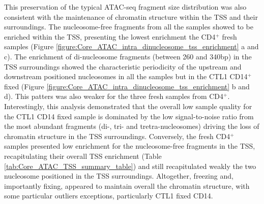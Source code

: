 This preservation of the typical ATAC-seq fragment size distribution was also consistent with the maintenance of chromatin structure within the TSS and their surroundings. The nucleosome-free fragments from all the samples showed to be enriched within the TSS, presenting the lowest enrichment the CD4$^+$ fresh samples (Figure \ref{figure:Core_ATAC_intra_dinucleosome_tss_enrichment} a and c). The enrichment of di-nucleosome fragments (between 260 and 340bp) in the TSS surroundings showed the characteristic periodicity of the upstream and downstream positioned nucleosomes in all the samples but in the CTL1 CD14$^+$ fixed (Figure \ref{figure:Core_ATAC_intra_dinucleosome_tss_enrichment} b and d). This patters was also weaker for the three fresh samples from CD4$^+$. Interestingly, this analysis demonstrated that the overall low sample quality for the CTL1 CD14 fixed sample is dominated by the low signal-to-noise ratio from the most abundant fragments (di-, tri- and tretra-nucleosomes) driving the loss of chromatin structure in the TSS surroundings. Conversely, the fresh CD4$^+$ samples presented low enrichment for the nucleosome-free fragments in the TSS, recapitulating their overall TSS enrichment (Table \ref{tab:Core_ATAC_TSS_summary_table}) and still recapitulated weakly the two nucleosome positioned in the TSS surroundings. Altogether, freezing and, importantly fixing, appeared to maintain overall the chromatin structure, with some particular outliers exceptions, particularly CTL1 fixed CD14.

